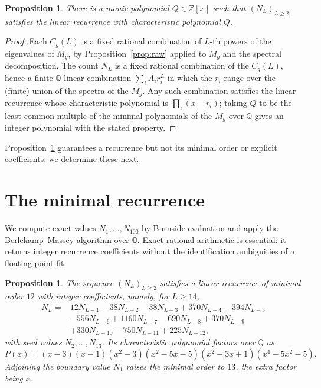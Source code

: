 \documentclass[11pt,a4paper]{article}
\theoremstyle{plain}
\newtheorem{proposition}[theorem]{Proposition}
\theoremstyle{definition}
\theoremstyle{remark}
\newcommand{\Z}{\mathbb{Z}}
\newcommand{\Q}{\mathbb{Q}}
\numberwithin{equation}{section}
\begin{document}
\begin{proposition}\label{prop:exists}
There is a monic polynomial $Q\in\Z[x]$ such that $(N_L)_{L\ge2}$ satisfies
the linear recurrence with characteristic polynomial $Q$.
\end{proposition}

\begin{proof}
Each $C_g(L)$ is a fixed rational combination of $L$-th powers of the
eigenvalues of $M_g$, by Proposition~\ref{prop:raw} applied to $M_g$ and
the spectral decomposition. The count $N_L$ is a fixed rational
combination of the $C_g(L)$, hence a finite $\Q$-linear combination
$\sum_i A_i r_i^{L}$ in which the $r_i$ range over the (finite) union of
the spectra of the $M_g$. Any such combination satisfies the linear
recurrence whose characteristic polynomial is $\prod_i (x-r_i)$; taking
$Q$ to be the least common multiple of the minimal polynomials of the
$M_g$ over $\Q$ gives an integer polynomial with the stated property.
\end{proof}

Proposition~\ref{prop:exists} guarantees a recurrence but not its minimal
order or explicit coefficients; we determine these next.

\section{The minimal recurrence}\label{sec:recurrence}

We compute exact values $N_1,\dots,N_{100}$ by Burnside evaluation and
apply the Berlekamp--Massey algorithm over $\Q$. Exact rational arithmetic
is essential: it returns integer recurrence coefficients without the
identification ambiguities of a floating-point fit.

\begin{proposition}\label{prop:minpoly}
The sequence $(N_L)_{L\ge2}$ satisfies a linear recurrence of minimal
order $12$ with integer coefficients, namely, for $L\ge14$,
\begin{equation}\label{eq:recur}
\begin{aligned}
N_L={}&12N_{L-1}-38N_{L-2}-38N_{L-3}+370N_{L-4}-394N_{L-5}\\
     &-556N_{L-6}+1160N_{L-7}-690N_{L-8}+370N_{L-9}\\
     &+330N_{L-10}-750N_{L-11}+225N_{L-12},
\end{aligned}
\end{equation}
with seed values $N_2,\dots,N_{13}$. Its characteristic polynomial factors
over $\Q$ as
\begin{equation}\label{eq:P}
P(x)=(x-3)(x-1)(x^{2}-3)(x^{2}-5x-5)(x^{2}-3x+1)(x^{4}-5x^{2}-5).
\end{equation}
Adjoining the boundary value $N_1$ raises the minimal order to $13$, the
extra factor being $x$.
\end{proposition}
\end{document}
